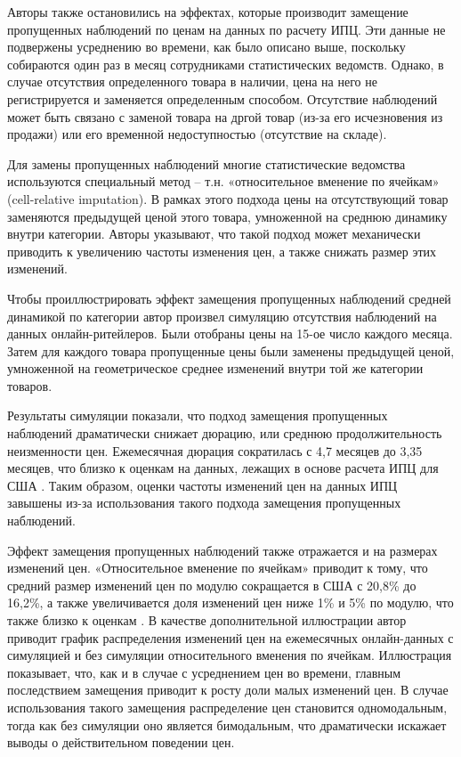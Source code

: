 Авторы также остановились на эффектах, которые производит замещение пропущенных наблюдений по ценам на данных по расчету ИПЦ. Эти данные не подвержены усреднению во времени, как было описано выше, поскольку собираются один раз в месяц сотрудниками статистических ведомств. Однако, в случае отсутствия определенного товара в наличии, цена на него не регистрируется и заменяется определенным способом. Отсутствие наблюдений может быть связано с заменой товара на дргой товар (из-за его исчезновения из продажи) или его временной недоступностью (отсутствие на складе). 

Для замены пропущенных наблюдений многие статистические ведомства используются специальный метод – т.н. «относительное вменение по ячейкам» (cell-relative imputation). В рамках этого подхода цены на отсутствующий товар заменяются предыдущей ценой этого товара, умноженной на среднюю динамику внутри категории. Авторы указывают, что такой подход может механически приводить к увеличению частоты изменения цен, а также снижать размер этих изменений.

Чтобы проиллюстрировать эффект замещения пропущенных наблюдений средней динамикой по категории автор произвел симуляцию отсутствия наблюдений на данных онлайн-ритейлеров. Были отобраны цены на 15-ое число каждого месяца. Затем для каждого товара пропущенные цены были заменены предыдущей ценой, умноженной на геометрическое среднее изменений внутри той же категории товаров.

Результаты симуляции показали, что подход замещения пропущенных наблюдений драматически снижает дюрацию, или среднюю продолжительность неизменности цен. Ежемесячная дюрация сократилась с 4,7 месяцев до 3,35 месяцев, что близко к оценкам на данных, лежащих в основе расчета ИПЦ для США \cite{klenow2008state}. Таким образом, оценки частоты изменений цен на данных ИПЦ завышены из-за использования такого подхода замещения пропущенных наблюдений.

Эффект замещения пропущенных наблюдений также отражается и на размерах изменений цен. «Относительное вменение по ячейкам» приводит к тому, что средний размер изменений цен по модулю сокращается в США с 20,8\% до 16,2\%, а также увеличивается доля изменений цен ниже 1\% и 5\% по модулю, что также близко к оценкам \cite{klenow2008state}. В качестве дополнительной иллюстрации автор приводит график распределения изменений цен на ежемесячных онлайн-данных с симуляцией и без симуляции относительного вменения по ячейкам. Иллюстрация показывает, что, как и в случае с усреднением цен во времени, главным последствием замещения приводит к росту доли малых изменений цен. В случае использования такого замещения распределение цен становится одномодальным, тогда как без симуляции оно является бимодальным, что драматически искажает выводы о действительном поведении цен.

